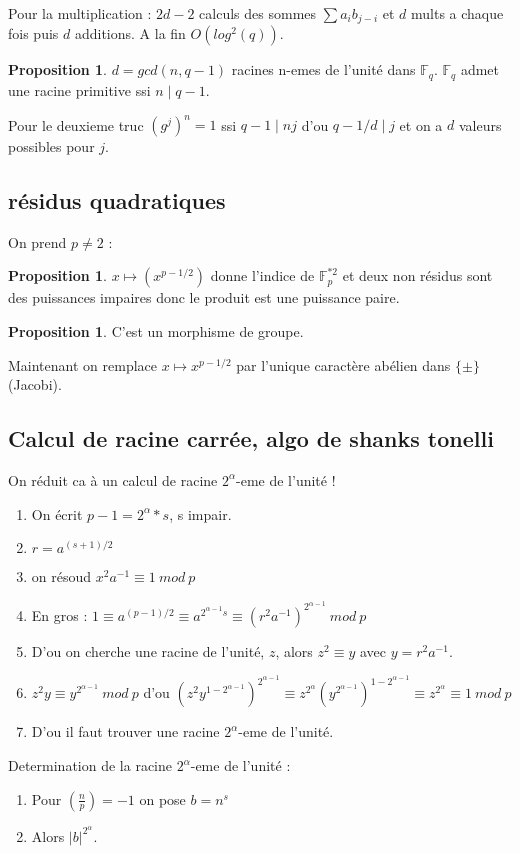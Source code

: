 \documentclass[12pt]{article}
\theoremstyle{plain}
\theoremstyle{definition}
\newtheorem{prop}[subsubsection]{Proposition}
\newcommand{\F}{\mathbb{F}}
\begin{document}
Pour la multiplication : $2d-2$ calculs des sommes $\sum a_ib_{j-i}$ et $d$ mults a chaque fois puis $d$ additions. A la fin 
$O(log^2(q))$. 


\begin{prop}
    $d=gcd(n, q-1)$ racines n-emes de l'unité dans $\F_q$. $\F_q$ admet une racine primitive ssi $n\mid q-1$.
\end{prop}
Pour le deuxieme truc $(g^j)^n=1$ ssi $q-1\mid nj$ d'ou $q-1/d\mid j$ et on a $d$ valeurs possibles pour $j$.

\subsection{résidus quadratiques}
On prend $p\ne 2$ : 
\begin{prop}
    $x\mapsto \left(x^{p-1/2}\right)$ donne l'indice de $\F_p^{*2}$ et deux non résidus sont des puissances impaires donc le produit est une puissance paire.
\end{prop}

\begin{prop}
    C'est un morphisme de groupe.
\end{prop}

Maintenant on remplace $x\mapsto x^{p-1/2}$ par l'unique caractère abélien dans $\{\pm\}$ (Jacobi).
\subsection{Calcul de racine carrée, algo de shanks tonelli}
On réduit ca à un calcul de racine $2^{\alpha}$-eme de l'unité !

\begin{enumerate}
    \item On écrit $p-1=2^{\alpha}*s$, s impair.
    \item $r=a^{(s+1)/2}$
    \item on résoud $x^2a^{-1}\equiv 1~mod~p$
    \item En gros : $1\equiv a^{(p-1)/2}\equiv a^{2^{\alpha-1}s}\equiv (r^2a^{-1})^{2^{\alpha-1}}~mod~p$
    \item D'ou on cherche une racine de l'unité, $z$, alors $z^2\equiv y$ avec $y=r^2a^{-1}$.
    \item $z^2y\equiv y^{2^{\alpha -1}}~mod~p$ d'ou $(z^2y^{1-2^{\alpha-1}})^{2^{\alpha-1}}\equiv z^{2^{\alpha}}(y^{2^{\alpha-1}})^{1-2^{\alpha-1}}\equiv z^{2^{\alpha}}\equiv1~mod~p$
    \item D'ou il faut trouver une racine $2^{\alpha}$-eme de l'unité.
\end{enumerate}
Determination de la racine $2^{\alpha}$-eme de l'unité :
\begin{enumerate}
    \item Pour $\left(\frac{n}{p}\right)=-1$ on pose $b=n^s$
    \item Alors $\lvert b\rvert^{2^{\alpha}}$.
\end{enumerate}
\end{document}
